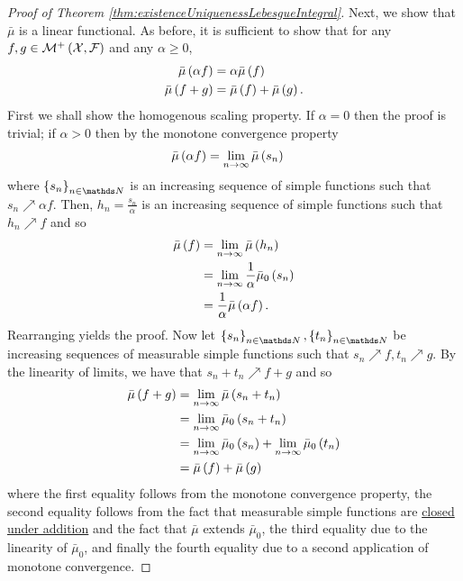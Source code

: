 \begin{proof}[Proof of Theorem \ref{thm:existenceUniquenessLebesgueIntegral}]
Next, we show that $\bar{\mu}$ is a linear functional. As before,
it is sufficient to show that for any $f,g\in\mathcal{M}^{+}\left(\mathcal{X},\mathcal{F}\right)$
and any $\alpha\geq0$,
\begin{align*}
\bar{\mu}\left(\alpha f\right) & =\alpha\bar{\mu}\left(f\right)\\
\bar{\mu}\left(f+g\right) & =\bar{\mu}\left(f\right)+\bar{\mu}\left(g\right).
\end{align*}
First we shall show the homogenous scaling property. If $\alpha=0$
then the proof is trivial; if $\alpha>0$ then by the monotone convergence
property 
\begin{align*}
\bar{\mu}\left(\alpha f\right) & =\lim_{n\to\infty}\bar{\mu}\left(s_{n}\right)
\end{align*}
where $\left\{ s_{n}\right\} _{n\in\N}$ is an increasing sequence
of simple functions such that $s_{n}\nearrow\alpha f$. Then, $h_{n}=\frac{s_{n}}{\alpha}$
is an increasing sequence of simple functions such that $h_{n}\nearrow f$
and so 
\begin{align*}
\bar{\mu}\left(f\right) & =\lim_{n\to\infty}\bar{\mu}\left(h_{n}\right)\\
 & =\lim_{n\to\infty}\frac{1}{\alpha}\bar{\mu}_{0}\left(s_{n}\right)\\
 & =\frac{1}{\alpha}\bar{\mu}\left(\alpha f\right).
\end{align*}
Rearranging yields the proof. Now let $\left\{ s_{n}\right\} _{n\in\N},\left\{ t_{n}\right\} _{n\in\N}$
be increasing sequences of measurable simple functions such that $s_{n}\nearrow f,t_{n}\nearrow g$.
By the linearity of limits, we have that $s_{n}+t_{n}\nearrow f+g$
and so
\begin{align*}
\bar{\mu}\left(f+g\right) & =\lim_{n\to\infty}\bar{\mu}\left(s_{n}+t_{n}\right)\\
 & =\lim_{n\to\infty}\bar{\mu}_{0}\left(s_{n}+t_{n}\right)\\
 & =\lim_{n\to\infty}\bar{\mu}_{0}\left(s_{n}\right)+\lim_{n\to\infty}\bar{\mu}_{0}\left(t_{n}\right)\\
 & =\bar{\mu}\left(f\right)+\bar{\mu}\left(g\right)
\end{align*}
where the first equality follows from the monotone convergence property,
the second equality follows from the fact that measurable simple functions
are \hyperref[prop:simpleFunctionsAddMultiply]{closed under addition}
and the fact that $\bar{\mu}$ extends $\bar{\mu}_{0}$, the third
equality due to the linearity of $\bar{\mu}_{0}$, and finally the
fourth equality due to a second application of monotone convergence.


\end{proof}
